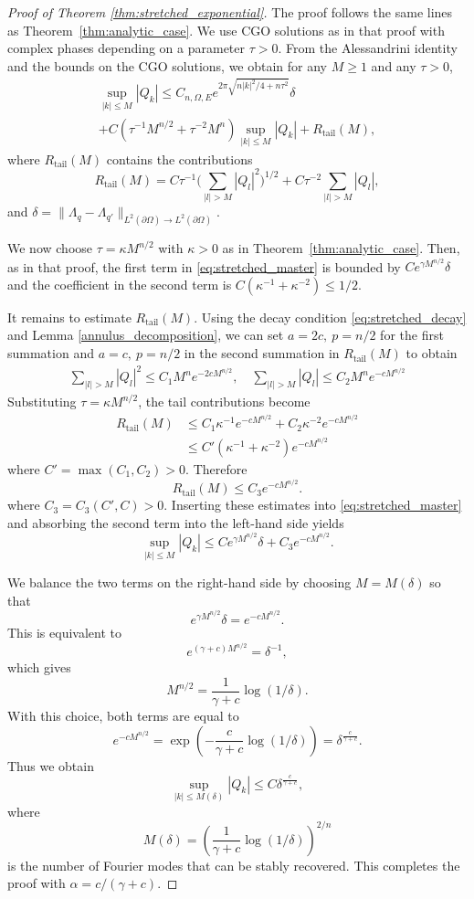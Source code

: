 \documentclass[a4paper, 11pt, twoside, notitlepage]{amsart}
\theoremstyle{definition}
\theoremstyle{remark}
\begin{document}
\begin{proof}[Proof of Theorem \ref{thm:stretched_exponential}]
The proof follows the same lines as Theorem~\ref{thm:analytic_case}. We use CGO solutions as in that proof with complex phases depending on a parameter $\tau > 0$. From the Alessandrini identity and the bounds on the CGO solutions, we obtain for any $M \geq 1$ and any $\tau > 0$,
\begin{multline}\label{eq:stretched_master}
\sup_{|k| \leq M} |Q_k| \leq C_{n,\Omega, E} e^{2\pi\sqrt{n|k|^2/4+n\tau^2}} \delta \\ 
+ C(\tau^{-1} M^{n/2}
 + \tau^{-2} M^n) \sup_{|k| \leq M} |Q_k| 
+ R_{\text{tail}}(M),
\end{multline}
where $R_{\text{tail}}(M)$ contains the  contributions
\[
R_{\text{tail}}(M) = C\tau^{-1}\Big(\sum_{|l| > M} |Q_l|^2\Big)^{1/2} + C\tau^{-2} \sum_{|l| > M} |Q_l|,
\]
and $\delta = \|\Lambda_q - \Lambda_{q'}\|_{L^2(\partial\Omega) \to L^2(\partial\Omega)}$.

We now choose $\tau = \kappa M^{n/2}$ with $\kappa > 0$ as in Theorem~\ref{thm:analytic_case}. Then, as in that proof, the first term in \eqref{eq:stretched_master} is bounded by $C e^{\gamma M^{n/2}} \delta$ and the coefficient in the second term is $C(\kappa^{-1} + \kappa^{-2}) \leq 1/2$.

It remains to estimate $R_{\text{tail}}(M)$. Using the decay condition \eqref{eq:stretched_decay} and Lemma \ref{annulus_decomposition}, we can set $a=2c,\ p=n/2$ for the first summation and $a=c,\ p=n/2$ in the second summation in $R_{\mathrm{tail}}(M)$ to obtain 
\begin{align*}
    \sum_{|l|>M} |Q_l|^2 \leq C_1M^ne^{-2cM^{n/2}}, \quad
    \sum_{|l|>M} |Q_l| \leq C_2M^n e^{-cM^{n/2}}
\end{align*}
Substituting $\tau = \kappa M^{n/2}$, the tail contributions become
\begin{align*}
R_{\text{tail}}(M) &\leq C_1\kappa^{-1} e^{-c M^{n/2}} + C_2\kappa^{-2} e^{-c M^{n/2}} \\ &\leq C'(\kappa^{-1}+\kappa^{-2}) e^{-c M^{n/2}}
\end{align*}
where $C'=\max(C_1,C_2)>0$. Therefore
\[
R_{\text{tail}}(M) \leq C_3 e^{-c M^{n/2}}.
\]
where $C_3=C_3(C',C)>0$.
Inserting these estimates into \eqref{eq:stretched_master} and absorbing the second term into the left-hand side yields
\[
\sup_{|k| \leq M} |Q_k| \leq C e^{\gamma M^{n/2}} \delta + C_3 e^{-c M^{n/2}}.
\]

We balance the two terms on the right-hand side by choosing $M = M(\delta)$ so that
\[
e^{\gamma M^{n/2}} \delta = e^{-c M^{n/2}}.
\]
This is equivalent to
\[
e^{(\gamma + c) M^{n/2}} = \delta^{-1},
\]
which gives
\[
M^{n/2} = \frac{1}{\gamma + c} \log(1/\delta).
\]
With this choice, both terms are equal to
\[
e^{-c M^{n/2}} = \exp\left(-\frac{c}{\gamma + c} \log(1/\delta)\right) = \delta^{\frac{c}{\gamma + c}}.
\]
Thus we obtain
\[
\sup_{|k| \leq M(\delta)} |Q_k| \leq C \delta^{\frac{c}{\gamma + c}},
\]
where
\[
M(\delta) = \left( \frac{1}{\gamma + c} \log(1/\delta) \right)^{2/n}
\]
is the number of Fourier modes that can be stably recovered. This completes the proof with $\alpha = c/(\gamma + c)$.
\end{proof}
\end{document}
